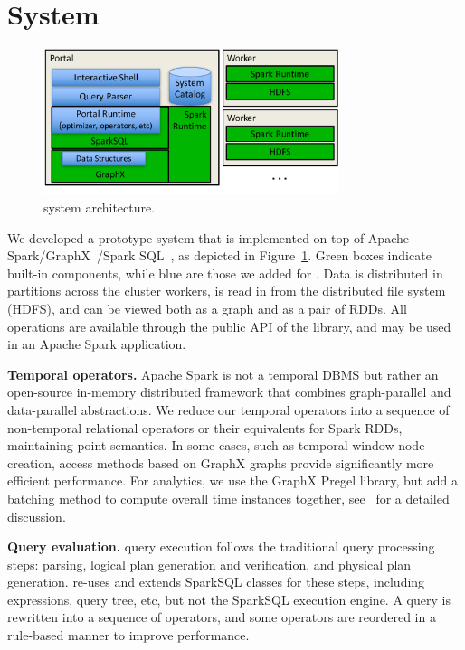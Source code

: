 \section{System}
\label{sec:sys}

\begin{figure}[t]
\centering
\includegraphics[width=3.4in]{figs/architecture.pdf}
\vspace{-0.4cm}
\caption{\sys system architecture.}
\vspace{-0.4cm}
\label{fig:arch}
\end{figure}

We developed a prototype system \sys that is implemented on top of
Apache Spark/GraphX~\cite{DBLP:conf/osdi/GonzalezXDCFS14}/Spark
SQL~\cite{Armbrust2015}, as depicted in Figure~\ref{fig:arch}.  Green
boxes indicate built-in components, while blue are those we added for
\sys.  Data is distributed in partitions across the cluster workers,
is read in from the distributed file system (HDFS), and can be viewed
both as a graph and as a pair of RDDs.  All \tg operations are
available through the public API of the \sys library, and may be used
in an Apache Spark application.

{\bf Temporal operators.}  Apache Spark is not a temporal DBMS but
rather an open-source in-memory distributed framework that combines
graph-parallel and data-parallel abstractions.  We reduce our temporal
operators into a sequence of non-temporal relational operators or their
equivalents for Spark RDDs, maintaining point semantics.  In some
cases, such as temporal window node creation, access methods based on
GraphX graphs provide significantly more efficient performance.  For
analytics, we use the GraphX Pregel library, but add a batching method
to compute overall time instances together,
see~\cite{MoffittTempWeb16} for a detailed discussion.

{\bf Query evaluation.}  \sys query execution follows the traditional
query processing steps: parsing, logical plan generation and
verification, and physical plan generation. \sys re-uses and extends
SparkSQL classes for these steps, including expressions, query tree,
etc, but not the SparkSQL execution engine.  A \ql query is rewritten
into a sequence of \tga operators, and some operators are reordered in
a rule-based manner to improve performance.


